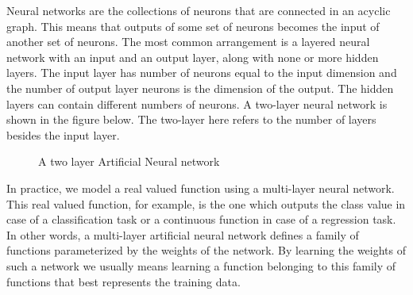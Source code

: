 Neural networks are the collections of neurons that are connected in an acyclic 
graph. This means that outputs of some set of neurons becomes the input of 
another set of neurons. The most common arrangement is a layered neural network 
with an input and an output layer, along with none or more hidden layers. 
The input layer has number of neurons equal to the input dimension and the 
number of output layer neurons is the dimension of the output. The hidden 
layers can contain different numbers of neurons. A two-layer neural network is 
shown in the figure below. The two-layer here refers to the number of layers 
besides the input layer.
\begin{figure}[H]
\caption{A two layer Artificial Neural network}
\end{figure}

In practice, we model a real valued function using a multi-layer neural 
network. This real valued function, for example, is the one which outputs the 
class value in case of a classification task or a continuous function in case 
of a regression task. In other words, a multi-layer artificial neural 
network defines a family of functions parameterized by the weights of the 
network. By learning the weights of such a network we usually means learning a 
function belonging to this family of functions that best represents the 
training 
data.

